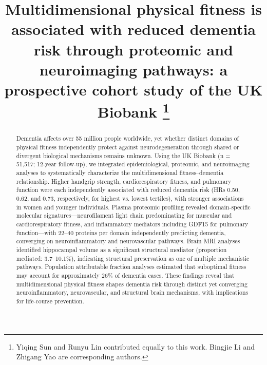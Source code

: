 \documentclass{article}
\title{Multidimensional physical fitness is associated with 
reduced dementia risk through proteomic 
and neuroimaging pathways: a prospective cohort study 
of the UK Biobank \thanks{Yiqing Sun and Runyu Lin contributed equally to this work. Bingjie Li and Zhigang Yao are corresponding authors.}}
\author{
  {\bfseries Yiqing Sun} \\
  Department of Statistics and Data Science \\
  National University of Singapore, Singapore \\
  {\small\texttt{yiqing.sun@u.nus.edu}}
  \and
  {\bfseries Runyu Lin} \\
  Department of Statistics and Data Science \\
  National University of Singapore, Singapore \\
  {\small\texttt{linr@u.nus.edu}}\\[-0.1em]\rule{0pt}{2.5ex}
  \and\and
  {\bfseries Jiayue Qin} \\
  Department of Statistics and Data Science \\
  National University of Singapore, Singapore \\
  {\small\texttt{e1349292@u.nus.edu}}
  \and
  {\bfseries Feiyue Pan} \\
  School of Mathematical Sciences \\
  Fudan University \\
  Shanghai, China \\
  {\small\texttt{25210180087@m.fudan.edu.cn}}\\[-0.1em]\rule{0pt}{2.5ex}
  \and\and
  {\bfseries Bingjie Li} \\
  Shanghai Institute for Mathematics\\ 
  and Interdisciplinary Sciences \\
  Shanghai, China \\
  {\small\texttt{mathloving@gmail.com}}\\[-0.1em]\rule{0pt}{2.5ex}
  \and
  {\bfseries Zhigang Yao} \\
  Department of Statistics and Data Science \\
  National University of Singapore, Singapore \\
  {\small\texttt{zhigang.yao@nus.edu.sg}}
}
\begin{document}
\maketitle


\begin{abstract}
Dementia affects over 55 million people worldwide, yet whether distinct domains of physical fitness independently protect against neurodegeneration through shared or divergent biological mechanisms remains unknown.
Using the UK Biobank (n = 51,517; 12-year follow-up), we integrated epidemiological, proteomic, and neuroimaging analyses to systematically characterize the multidimensional fitness–dementia relationship.
Higher handgrip strength, cardiorespiratory fitness, and pulmonary function were each independently associated with reduced dementia risk (HRs 0.50, 0.62, and 0.73, respectively, for highest vs. lowest tertiles), with stronger associations in women and younger individuals.
Plasma proteomic profiling revealed domain-specific molecular signatures—neurofilament light chain predominating for muscular and cardiorespiratory fitness, and inflammatory mediators including GDF15 for pulmonary function—with 22–40 proteins per domain independently predicting dementia, converging on neuroinflammatory and neurovascular pathways.
Brain MRI analyses identified hippocampal volume as a significant structural mediator (proportion mediated: 3.7–10.1\%), indicating structural preservation as one of multiple mechanistic pathways.
Population attributable fraction analyses estimated that suboptimal fitness may account for approximately 26\% of dementia cases.
These findings reveal that multidimensional physical fitness shapes dementia risk through distinct yet converging neuroinflammatory, neurovascular, and structural brain mechanisms, with implications for life-course prevention.
\end{abstract}

\end{document}
